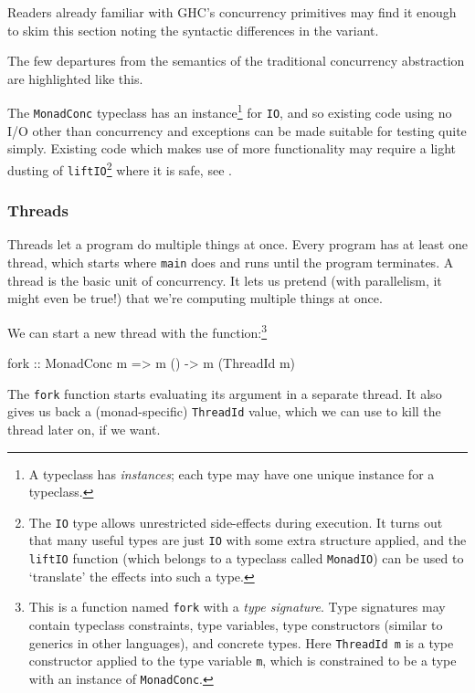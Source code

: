 Readers already familiar with GHC's concurrency primitives may find it
enough to skim this section noting the syntactic differences in the
\dejafu{} variant.

\begin{departure}
  The few departures from the semantics of the traditional concurrency
  abstraction are highlighted like this.
\end{departure}

The \verb|MonadConc| typeclass has an instance\footnote{A typeclass
  has \emph{instances}; each type may have one unique instance for a
  typeclass.} for \verb|IO|, and so existing code using no I/O other
than concurrency and exceptions can be made suitable for testing quite
simply. Existing code which makes use of more functionality may
require a light dusting of \verb|liftIO|\footnote{The \texttt{IO} type
  allows unrestricted side-effects during execution. It turns out that
  many useful types are just \texttt{IO} with some extra structure
  applied, and the \texttt{liftIO} function (which belongs to a
  typeclass called \texttt{MonadIO}) can be used to `translate' the
  effects into such a type.} where it is safe, see
.

\subsubsection{Threads}
\label{sec:abstraction-typeclass-threads}

Threads let a program do multiple things at once. Every program has at
least one thread, which starts where \verb|main| does and runs until
the program terminates. A thread is the basic unit of concurrency. It
lets us pretend (with parallelism, it might even be true!) that we're
computing multiple things at once.

We can start a new thread with the function:\footnote{This is a
  function named \texttt{fork} with a \emph{type signature}. Type
  signatures may contain typeclass constraints, type variables, type
  constructors (similar to generics in other languages), and concrete
  types. Here \texttt{ThreadId m} is a type constructor applied to the
  type variable \texttt{m}, which is constrained to be a type with an
  instance of \texttt{MonadConc}.}

\begin{haskellcode}
fork :: MonadConc m => m () -> m (ThreadId m)
\end{haskellcode}

The \verb|fork| function starts evaluating its argument in a separate
thread. It also gives us back a (monad-specific) \verb|ThreadId|
value, which we can use to kill the thread later on, if we want.

